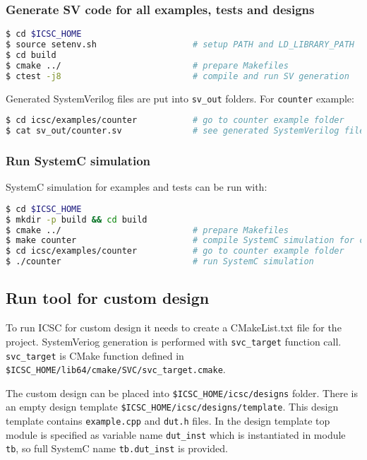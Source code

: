 \subsubsection{Generate SV code for all examples, tests and designs}
%
\begin{lstlisting}[language=bash]
$ cd $ICSC_HOME
$ source setenv.sh                   # setup PATH and LD_LIBRARY_PATH
$ cd build   
$ cmake ../                          # prepare Makefiles 
$ ctest -j8                          # compile and run SV generation
\end{lstlisting}

Generated SystemVerilog files are put into {\tt sv\_out} folders. 
For {\tt counter} example:
% 
\begin{lstlisting}[language=bash]
$ cd icsc/examples/counter           # go to counter example folder 
$ cat sv_out/counter.sv              # see generated SystemVerilog file 
\end{lstlisting}

\subsubsection{Run SystemC simulation}

SystemC simulation for examples and tests can be run with:
\begin{lstlisting}[language=bash]
$ cd $ICSC_HOME
$ mkdir -p build && cd build
$ cmake ../                          # prepare Makefiles 
$ make counter                       # compile SystemC simulation for counter example
$ cd icsc/examples/counter           # go to counter example folder
$ ./counter                          # run SystemC simulation 
\end{lstlisting}

\subsection{Run tool for custom design}

To run ICSC for custom design it needs to create a CMakeList.txt file for the project. SystemVeriog generation is performed with {\tt svc\_target} function call. {\tt svc\_target} is CMake function defined in {\tt \$ICSC\_HOME/lib64/cmake/SVC/svc\_target.cmake}. 

The custom design can be placed into {\tt \$ICSC\_HOME/icsc/designs} folder. 
There is an empty design template {\tt\$ICSC\_HOME/icsc/designs/template}. This design template contains {\tt example.cpp} and {\tt dut.h} files. 
In the design template top module is specified as  variable name {\tt dut\_inst} which is instantiated in module {\tt tb}, so full SystemC name {\tt tb.dut\_inst} is provided.

